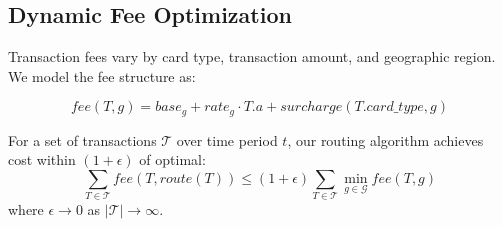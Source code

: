 \subsection{Dynamic Fee Optimization}

Transaction fees vary by card type, transaction amount, and geographic region. We model the fee structure as:

\begin{equation}
fee(T, g) = base_g + rate_g \cdot T.a + surcharge(T.card\_type, g)
\end{equation}

\begin{theorem}
For a set of transactions $\mathcal{T}$ over time period $t$, our routing algorithm achieves cost within $(1 + \epsilon)$ of optimal:
\begin{equation}
\sum_{T \in \mathcal{T}} fee(T, route(T)) \leq (1 + \epsilon) \sum_{T \in \mathcal{T}} \min_{g \in \mathcal{G}} fee(T, g)
\end{equation}
where $\epsilon \rightarrow 0$ as $|\mathcal{T}| \rightarrow \infty$.
\end{theorem}

